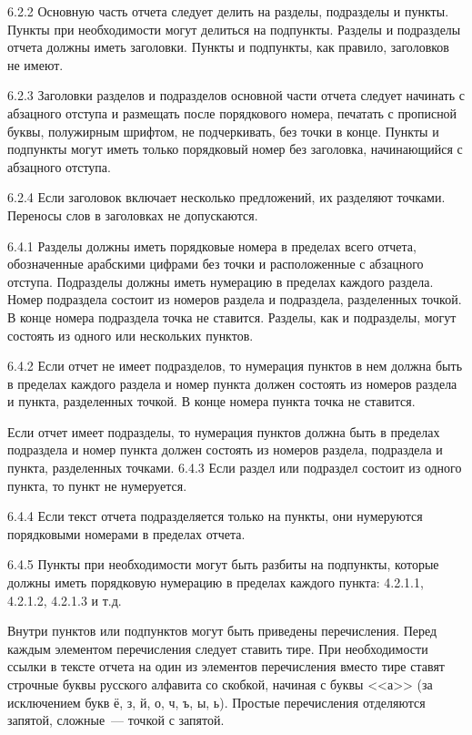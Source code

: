 6.2.2 Основную часть отчета следует делить на разделы, подразделы и пункты.
Пункты при необходимости могут делиться на подпункты. Разделы и подразделы
отчета должны иметь заголовки. Пункты и подпункты, как правило, заголовков не
имеют.

6.2.3 Заголовки разделов и подразделов основной части отчета следует начинать с
абзацного отступа и размещать после порядкового номера, печатать с прописной
буквы, полужирным шрифтом, не подчеркивать, без точки в конце. Пункты и
подпункты могут иметь только порядковый номер без заголовка, начинающийся с
абзацного отступа.

6.2.4 Если заголовок включает несколько предложений, их разделяют точками.
Переносы слов в заголовках не допускаются.

6.4.1 Разделы должны иметь порядковые номера в пределах всего отчета,
обозначенные арабскими цифрами без точки и расположенные с абзацного отступа.
Подразделы должны иметь нумерацию в пределах каждого раздела. Номер подраздела
состоит из номеров раздела и подраздела, разделенных точкой. В конце номера
подраздела точка не ставится. Разделы, как и подразделы, могут состоять из
одного или нескольких пунктов.

6.4.2 Если отчет не имеет подразделов, то нумерация пунктов в нем должна быть в
пределах каждого раздела и номер пункта должен состоять из номеров раздела и
пункта, разделенных точкой. В конце номера пункта точка не ставится.

Если отчет имеет подразделы, то нумерация пунктов должна быть в пределах
подраздела и номер пункта должен состоять из номеров раздела, подраздела и
пункта, разделенных точками.
6.4.3 Если раздел или подраздел состоит из одного пункта, то пункт не
нумеруется.

6.4.4 Если текст отчета подразделяется только на пункты, они нумеруются
порядковыми номерами в пределах отчета.

6.4.5 Пункты при необходимости могут быть разбиты на подпункты, которые должны
иметь порядковую нумерацию в пределах каждого пункта: 4.2.1.1, 4.2.1.2, 4.2.1.3
и т.д.


Внутри пунктов или подпунктов могут быть приведены перечисления.  Перед каждым
элементом перечисления следует ставить тире. При необходимости ссылки в тексте
отчета на один из элементов перечисления вместо тире ставят строчные буквы
русского алфавита со скобкой, начиная с буквы <<а>> (за исключением букв ё, з,
й, о, ч, ъ, ы, ь). Простые перечисления отделяются запятой, сложные~--- точкой
с запятой.

